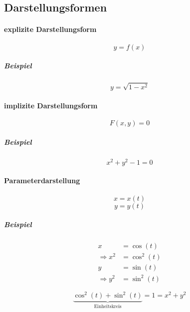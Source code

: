 \subsection{Darstellungsformen}

\paragraph{explizite Darstellungsform}

\[
    y = f(x)
\]

\subparagraph{Beispiel}

\[
    y = \sqrt{1-x^2}
\]

\paragraph{implizite Darstellungsform}

\[
    F(x,y) = 0
\]

\subparagraph{Beispiel}

\[
    x^2 + y^2 - 1 = 0
\]

\paragraph{Parameterdarstellung}

\[
    x = x(t)
\]
\[ 
    y = y(t)
\]

\subparagraph{Beispiel}

\begin{align*}
    x &= \cos(t) \\
    \Rightarrow x^2 &= \cos^2(t) \\
    y &= \sin(t) \\
    \Rightarrow y^2 &= \sin^2(t)
\end{align*}

\[
    \underbrace{\cos^2(t) + \sin^2(t)}_{\text{Einheitskreis}} = 1 = x^2 + y^2
\]
